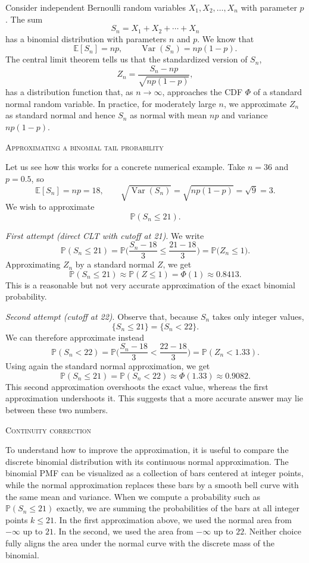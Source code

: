 Consider independent Bernoulli random variables \(X_1, X_2, \ldots, X_n\) with parameter \(p\).  
The sum
\[
S_n = X_1 + X_2 + \cdots + X_n
\]
has a binomial distribution with parameters \(n\) and \(p\).  
We know that
\[
\mathbb{E}[S_n] = np,
\qquad
\operatorname{Var}(S_n) = np(1-p).
\]
The central limit theorem tells us that the standardized version of \(S_n\),
\[
Z_n
=
\frac{S_n - np}{\sqrt{np(1-p)}},
\]
has a distribution function that, as \(n \to \infty\), approaches the CDF \(\Phi\) of a standard normal random variable.  
In practice, for moderately large \(n\), we approximate \(Z_n\) as standard normal and hence \(S_n\) as normal with mean \(np\) and variance \(np(1-p)\).

\bigskip
\textsc{Approximating a binomial tail probability}

Let us see how this works for a concrete numerical example.  
Take \(n = 36\) and \(p = 0.5\), so
\[
\mathbb{E}[S_n] = np = 18,
\qquad
\sqrt{\operatorname{Var}(S_n)} = \sqrt{np(1-p)} = \sqrt{9} = 3.
\]
We wish to approximate
\[
\mathbb{P}(S_n \leq 21).
\]

\textit{First attempt (direct CLT with cutoff at 21)}.  
We write
\[
\mathbb{P}(S_n \leq 21)
=
\mathbb{P}\Big(\frac{S_n - 18}{3} \leq \frac{21 - 18}{3}\Big)
=
\mathbb{P}\Big(Z_n \leq 1\Big).
\]
Approximating \(Z_n\) by a standard normal \(Z\), we get
\[
\mathbb{P}(S_n \leq 21)
\approx
\mathbb{P}(Z \leq 1)
=
\Phi(1)
\approx 0.8413.
\]
This is a reasonable but not very accurate approximation of the exact binomial probability.

\textit{Second attempt (cutoff at 22)}.  
Observe that, because \(S_n\) takes only integer values,
\[
\{S_n \leq 21\}
=
\{S_n < 22\}.
\]
We can therefore approximate instead
\[
\mathbb{P}(S_n < 22)
=
\mathbb{P}\Big(\frac{S_n - 18}{3} < \frac{22 - 18}{3}\Big)
=
\mathbb{P}(Z_n < 1.33).
\]
Using again the standard normal approximation, we get
\[
\mathbb{P}(S_n \leq 21)
=
\mathbb{P}(S_n < 22)
\approx
\Phi(1.33)
\approx 0.9082.
\]
This second approximation overshoots the exact value, whereas the first approximation undershoots it.  
This suggests that a more accurate answer may lie between these two numbers.

\bigskip
\textsc{Continuity correction}

To understand how to improve the approximation, it is useful to compare the discrete binomial distribution with its continuous normal approximation.  
The binomial PMF can be visualized as a collection of bars centered at integer points, while the normal approximation replaces these bars by a smooth bell curve with the same mean and variance.  
When we compute a probability such as \(\mathbb{P}(S_n \leq 21)\) exactly, we are summing the probabilities of the bars at all integer points \(k \leq 21\).  
In the first approximation above, we used the normal area from \(-\infty\) up to \(21\).  
In the second, we used the area from \(-\infty\) up to \(22\).  
Neither choice fully aligns the area under the normal curve with the discrete mass of the binomial.

